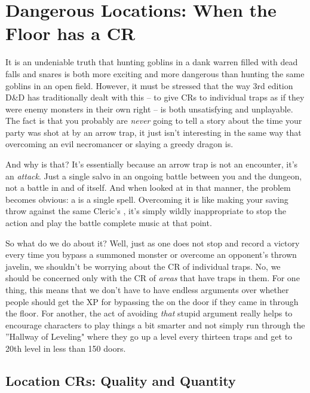 \section{Dangerous Locations: When the Floor has a CR}

It is an undeniable truth that hunting goblins in a dank warren filled with dead falls and snares is both more exciting and more dangerous than hunting the same goblins in an open field. However, it must be stressed that the way 3rd edition D\&D has traditionally dealt with this -- to give CRs to individual traps as if they were enemy monsters in their own right -- is both unsatisfying and unplayable. The fact is that you probably are \textit{never} going to tell a story about the time your party was shot at by an arrow trap, it just isn't interesting in the same way that overcoming an evil necromancer or slaying a greedy dragon is.

And why is that? It's essentially because an arrow trap is not an encounter, it's an \textit{attack}. Just a single salvo in an ongoing battle between you and the dungeon, not a battle in and of itself. And when looked at in that manner, the problem becomes obvious: a  is a single spell. Overcoming it is like making your saving throw against the same Cleric's , it's simply wildly inappropriate to stop the action and play the battle complete music at that point.

So what do we do about it? Well, just as one does not stop and record a victory every time you bypass a summoned monster or overcome an opponent's thrown javelin, we shouldn't be worrying about the CR of individual traps. No, we should be concerned only with the CR of \textit{areas} that have traps in them. For one thing, this means that we don't have to have endless arguments over whether people should get the XP for bypassing the  on the door if they came in through the floor. For another, the act of avoiding \textit{that} stupid argument really helps to encourage characters to play things a bit smarter and not simply run through the ''Hallway of Leveling" where they go up a level every thirteen traps and get to 20th level in less than 150 doors.

\subsection{Location CRs: Quality and Quantity}
\vspace*{-8pt}

